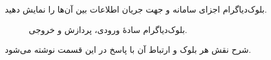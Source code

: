 \documentclass[\AssignmentBaseSize,a4paper]{article}
\begin{document}
\begin{problem}[۲۵ نمره]{بلوک‌دیاگرام}
  اجزای سامانه و جهت جریان اطلاعات بین آن‌ها را نمایش دهید.
\end{problem}
\begin{solution}
  \begin{figure}[H]
    \begin{diagramarea}
    \end{diagramarea}
    \caption{بلوک‌دیاگرام سادهٔ ورودی، پردازش و خروجی.}
    \label{fig:starter-block}
  \end{figure}
  شرح نقش هر بلوک و ارتباط آن با پاسخ در این قسمت نوشته می‌شود.
\end{solution}
\end{document}
